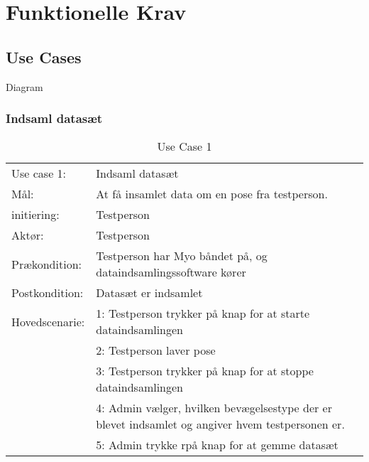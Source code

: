 \chapter{Funktionelle Krav}

\section{Use Cases}
Diagram
\subsection{Indsaml datasæt}
\bgroup
\def\arraystretch{1.8}
\begin{center}
	\begin{table}[htbp]
		\begin{tabular}{lp{10cm}}
			\rowcolor{grey} Use case 1:		& Indsaml datasæt \\
			Mål: 	& At få insamlet data om en pose fra testperson. \\
			initiering:	& Testperson\\
			Aktør: & Testperson\\
			Prækondition: & Testperson har Myo båndet på, og dataindsamlingssoftware kører\\
			Postkondition: & Datasæt er indsamlet\\
			Hovedscenarie: & 1: Testperson trykker på knap for at starte dataindsamlingen\\
			& 2: Testperson laver pose\\
			& 3: Testperson trykker på knap for at stoppe dataindsamlingen\\
			& 4: Admin vælger, hvilken bevægelsestype der er blevet indsamlet og angiver hvem testpersonen er.\\
			& 5: Admin trykke rpå knap for at gemme datasæt\\
		\end{tabular}
		\caption{Use Case 1}
	\end{table}
\end{center}

